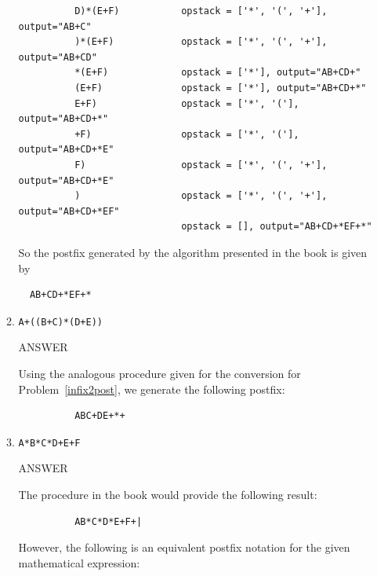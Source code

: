 \documentclass{article} %
\newenvironment{mpage}
  {\hspace{0.1in}
   \begin{minipage}{4.5in}
     \setlength{\parskip}{.5em}
     \vspace{0.1in}}    
  {\vspace{0.1in}
   \end{minipage}}
\begin{document}
\begin{enumerate}
\begin{enumerate}
\begin{mpage}
\begin{verbatim}
          D)*(E+F)           opstack = ['*', '(', '+'], output="AB+C"
          )*(E+F)            opstack = ['*', '(', '+'], output="AB+CD"
          *(E+F)             opstack = ['*'], output="AB+CD+"
          (E+F)              opstack = ['*'], output="AB+CD+*"
          E+F)               opstack = ['*', '('], output="AB+CD+*"
          +F)                opstack = ['*', '('], output="AB+CD+*E"
          F)                 opstack = ['*', '(', '+'], output="AB+CD+*E"
          )                  opstack = ['*', '(', '+'], output="AB+CD+*EF"
                             opstack = [], output="AB+CD+*EF+*"
        \end{verbatim}
         
        So the postfix generated by the algorithm presented in the book is
        given by
        
\begin{verbatim}
  AB+CD+*EF+*
\end{verbatim}

      \vspace{.1in}
    \end{mpage}

  \item
    \verb|A+((B+C)*(D+E))|
    
    \begin{mpage}
      ANSWER

      Using the analogous procedure given for the conversion
      for Problem~\ref{infix2post}, we generate the following postfix:

        \begin{verbatim}
          ABC+DE+*+
        \end{verbatim}

      \vspace{.1in}
    \end{mpage}

      
  \item
    \verb|A*B*C*D+E+F|

    \begin{mpage}
      ANSWER

      The procedure in the book would provide the following result:
      
        \begin{verbatim}
          AB*C*D*E+F+|
        \end{verbatim}

      However, the following is an equivalent postfix notation for the given
      mathematical expression:


\end{mpage}
\end{enumerate}
\end{enumerate}
\end{document}
